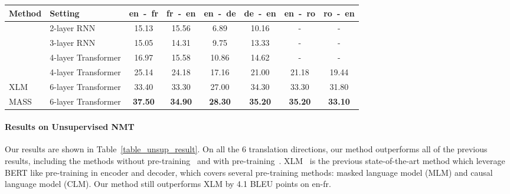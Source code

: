 \documentclass{article}
\begin{document}
	\fi
	\begin{table*}[h]
		\small
		\centering
		\begin{tabular}{l|l|c c |  c c | c c}
			\toprule
Method & Setting & en~-~fr & fr~-~en & en~-~de & de~-~en &en~-~ro & ro~-~en \\
			\midrule
			\citet{artetxe2017unsupervised} & 2-layer RNN & 15.13 & 15.56 & 6.89 & 10.16 & - & - \\
			\citet{lample2017unsupervised}  & 3-layer RNN & 15.05 & 14.31 & 9.75  & 13.33 & - & - \\
			\citet{yang2018unsupervised}    & 4-layer Transformer & 16.97 & 15.58 & 10.86 & 14.62 & - & - \\
			
			\citet{DBLP:conf/emnlp/LampleOCDR18} & 4-layer Transformer & 25.14 & 24.18 & 17.16 & 21.00 & 21.18 & 19.44 \\
			
			XLM~\citep{Lample2019MLM}  			& 6-layer Transformer & 33.40 & 33.30 & 27.00 & 34.30 & 33.30 & 31.80 \\
			\midrule
			
			MASS & 6-layer Transformer & \textbf{37.50} & \textbf{34.90} & \textbf{28.30} & \textbf{35.20} & \textbf{35.20} & \textbf{33.10} \\
			\bottomrule
			
		\end{tabular}
		\vspace{-0.2cm}
		\caption{The BLEU score comparisons between MASS and the previous works on unsupervised NMT. Results on en-fr and fr-en pairs are reported on \emph{newstest2014} and the others are on \emph{newstest2016}. Since XLM uses different combinations of MLM and CLM in the encoder and decoder, we report the highest BLEU score for XLM on each language pair. }
		\label{table_unsup_result}
	\end{table*}
	
	\paragraph{Results on Unsupervised NMT} Our results are shown in Table~\ref{table_unsup_result}. On all the 6 translation directions, our method outperforms all of the previous results, including the methods without pre-training~\citep{DBLP:conf/emnlp/LampleOCDR18} and with pre-training~\citep{Lample2019MLM}. XLM~\citep{Lample2019MLM} is the previous state-of-the-art method which leverage BERT like pre-training in encoder and decoder, which covers several pre-training methods: masked language model (MLM) and causal language model (CLM). Our method still outperforms XLM by 4.1 BLEU points on en-fr.
	
\end{document}
